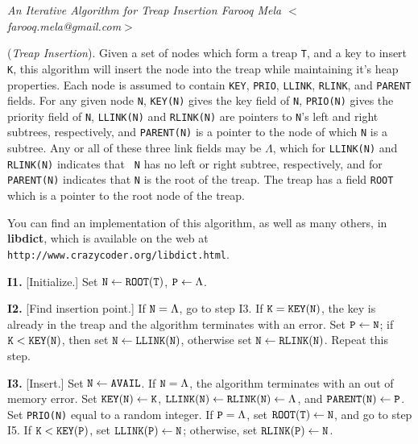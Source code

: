 \nopagenumbers
\parskip=2pt
\parindent=0pt

{\sl An Iterative Algorithm for Treap Insertion
	\hfill \rm Farooq Mela $<$farooq.mela@gmail.com$>$}

\medskip

 ({\it Treap Insertion}).
Given a set of nodes which form a treap {\tt T}, and a key to insert
{\tt K}, this algorithm will insert the node into the treap while maintaining
it's heap properties. Each node is assumed to contain {\tt KEY}, {\tt PRIO},
{\tt LLINK}, {\tt RLINK}, and {\tt PARENT} fields. For any given node {\tt N},
{\tt KEY(N)} gives the key field of {\tt N}, {\tt PRIO(N)} gives the priority
field of {\tt N}, {\tt LLINK(N)} and {\tt RLINK(N)} are pointers to {\tt N}'s
left and right subtrees, respectively, and {\tt PARENT(N)} is a pointer to the
node of which {\tt N} is a subtree. Any or all of these three link fields may
be $\Lambda$, which for {\tt LLINK(N)} and {\tt RLINK(N)} indicates that {\tt
N} has no left or right subtree, respectively, and for {\tt PARENT(N)}
indicates that {\tt N} is the root of the treap. The treap has a field
{\tt ROOT} which is a pointer to the root node of the treap.

\medskip
You can find an implementation of this algorithm, as well as many others, in
{\bf libdict}, which is available on the web at
{\tt http://www.crazycoder.org/libdict.html}.
\medskip

\parindent=36pt

\item{\bf I1.} [Initialize.]
Set ${\tt N} \gets {\tt ROOT(T)}$, ${\tt P} \gets \Lambda$.

\item{\bf I2.} [Find insertion point.]
If ${\tt N} = \Lambda$, go to step I3.
If ${\tt K} = {\tt KEY(N)}$,
the key is already in the treap and the algorithm terminates with an error.
Set ${\tt P} \gets {\tt N}$;
if ${\tt K} < {\tt KEY(N)}$,
then set ${\tt N} \gets {\tt LLINK(N)}$,
otherwise set ${\tt N} \gets {\tt RLINK(N)}$. Repeat this step.

\item{\bf I3.} [Insert.]
Set ${\tt N} \gets {\tt AVAIL}$.
If ${\tt N} = \Lambda$, the algorithm terminates with an out of memory error.
Set ${\tt KEY(N)} \gets {\tt K}$,
${\tt LLINK(N)} \gets {\tt RLINK(N)} \gets \Lambda$, and
${\tt PARENT(N)} \gets {\tt P}$.
Set {\tt PRIO(N)} equal to a random integer.
If ${\tt P} = \Lambda$, set ${\tt ROOT(T)} \gets {\tt N}$, and go to step I5.
If ${\tt K} < {\tt KEY(P)}$,
set ${\tt LLINK(P)} \gets {\tt N}$; otherwise,
set ${\tt RLINK(P)} \gets {\tt N}$.

